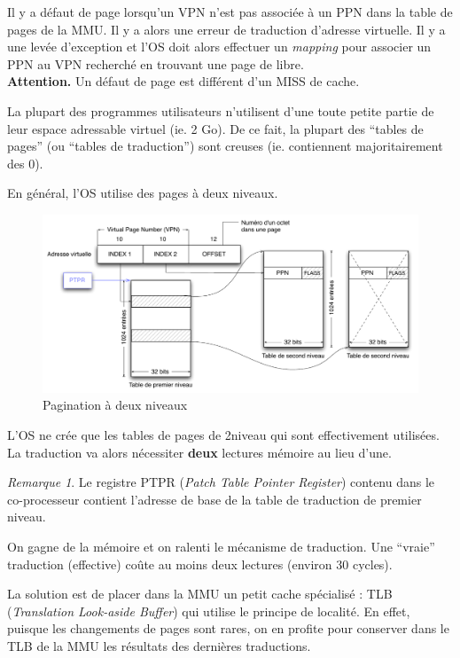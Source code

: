 \documentclass[11pt,english,french]{scrreprt}
\theoremstyle{remark}
\newtheorem*{rem*}{Remarque}
\theoremstyle{definition}
\begin{document}
Il y a défaut de page lorsqu'un VPN n'est pas associée à un PPN dans la table de pages de la MMU. Il y a alors une erreur de traduction d'adresse virtuelle. Il y a une levée d'exception et l'OS doit alors effectuer un \emph{mapping} pour associer un PPN au VPN recherché en trouvant une page de libre.\\
\textbf{Attention.} Un défaut de page est différent d'un MISS de cache.

La plupart des programmes utilisateurs n'utilisent d'une toute petite partie de leur espace adressable virtuel (ie. 2 Go). De ce fait, la plupart des ``tables de pages'' (ou ``tables de traduction'') sont creuses (ie. contiennent majoritairement des 0).

En général, l'OS utilise des pages à deux niveaux.
\begin{figure}[!h]
	\center
	\includegraphics[scale=.60]{diagrammes/pagination_2_niv}
	\caption{Pagination à deux niveaux}
\end{figure}

L'OS ne crée que les tables de pages de 2\ieme niveau qui sont effectivement utilisées.\\
La traduction va alors nécessiter \textbf{deux} lectures mémoire au lieu d'une.

\begin{rem*}
	Le registre PTPR (\emph{Patch Table Pointer Register}) contenu dans le co-processeur contient l'adresse de base de la table de traduction de premier niveau.
\end{rem*}

On gagne de la mémoire et on ralenti le mécanisme de traduction. Une ``vraie'' traduction (effective) coûte au moins deux lectures (environ 30 cycles).

La solution est de placer dans la MMU un petit cache spécialisé : TLB (\emph{Translation Look-aside Buffer}) qui utilise le principe de localité. En effet, puisque les changements de pages sont rares, on en profite pour conserver dans le TLB de la MMU les résultats des dernières traductions.
\end{document}
